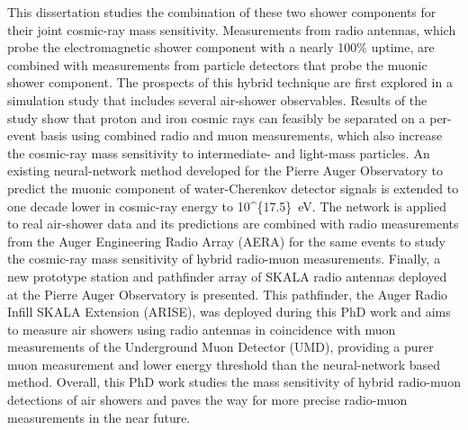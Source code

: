This dissertation studies the combination of these two shower components for their joint cosmic-ray mass sensitivity.
Measurements from radio antennas, which probe the electromagnetic shower component with a nearly 100\% uptime, are combined with measurements from particle detectors that probe the muonic shower component.
The prospects of this hybrid technique are first explored in a simulation study that includes several air-shower observables.
Results of the study show that proton and iron cosmic rays can feasibly be separated on a per-event basis using combined radio and muon measurements, which also increase the cosmic-ray mass sensitivity to intermediate- and light-mass particles.
An existing neural-network method developed for the Pierre Auger Observatory to predict the muonic component of water-Cherenkov detector signals is extended to one decade lower in cosmic-ray energy to \qty[parse-numbers=false]{10^{17.5}}{\electronvolt}.
The network is applied to real air-shower data and its predictions are combined with radio measurements from the Auger Engineering Radio Array (AERA) for the same events to study the cosmic-ray mass sensitivity of hybrid radio-muon measurements.
Finally, a new prototype station and pathfinder array of SKALA radio antennas deployed at the Pierre Auger Observatory is presented.
This pathfinder, the Auger Radio Infill SKALA Extension (ARISE), was deployed during this PhD work and aims to measure air showers using radio antennas in coincidence with muon measurements of the Underground Muon Detector (UMD), providing a purer muon measurement and lower energy threshold than the neural-network based method.
Overall, this PhD work studies the mass sensitivity of hybrid radio-muon detections of air showers and paves the way for more precise radio-muon measurements in the near future.






